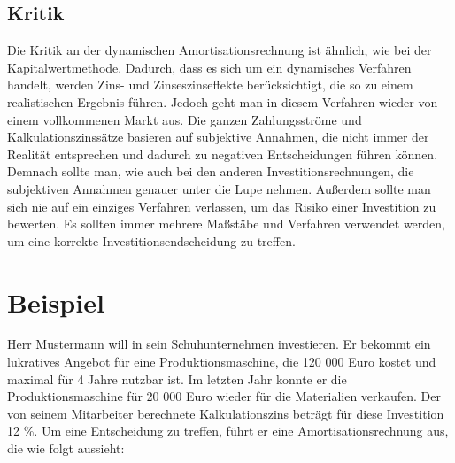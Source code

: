 \subsection{Kritik}
Die Kritik an der dynamischen Amortisationsrechnung ist ähnlich, wie bei der Kapitalwertmethode. Dadurch, dass es sich um ein dynamisches Verfahren handelt, werden Zins- und Zinseszinseffekte berücksichtigt, die so zu einem realistischen Ergebnis führen. Jedoch geht man in diesem Verfahren wieder von einem vollkommenen Markt aus. Die ganzen Zahlungsströme und Kalkulationszinssätze basieren auf subjektive Annahmen, die nicht immer der Realität entsprechen und dadurch zu negativen Entscheidungen führen können. Demnach sollte man, wie auch bei den anderen Investitionsrechnungen, die subjektiven Annahmen genauer unter die Lupe nehmen. Außerdem sollte man sich nie auf ein einziges Verfahren verlassen, um das Risiko einer Investition zu bewerten. Es sollten immer mehrere Maßstäbe und Verfahren verwendet werden, um eine korrekte Investitionsendscheidung zu treffen.
\newpage
\section{Beispiel}
Herr Mustermann will in sein Schuhunternehmen investieren. Er bekommt ein lukratives Angebot für eine Produktionsmaschine, die 120 000 Euro kostet und maximal für 4 Jahre nutzbar ist. Im letzten Jahr konnte er die Produktionsmaschine für 20 000 Euro wieder für die Materialien verkaufen. Der von seinem Mitarbeiter berechnete Kalkulationszins beträgt für diese Investition 12 \%. Um eine Entscheidung zu treffen, führt er eine Amortisationsrechnung aus, die wie folgt aussieht:

